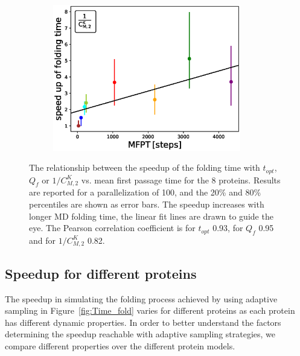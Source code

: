 \begin{figure}[!ht]
\begin{subfigure}[t]{0.5\textwidth}
    \includegraphics[width=0.9\textwidth]{figures/compare_MD_speed_up_cmacro_kin_cont_50_6_steps10000_52.eps}
  \end{subfigure}
  \caption{The relationship between the speedup of the folding time with $t_{opt}$, $Q_f$
  or $1/C_{M,2}^K$ vs. mean first passage time for the 8 proteins. Results are reported for a
  parallelization of 100, and the 20\% and 80\% percentiles are shown as error
  bars. The speedup increases with longer MD folding time, the linear fit lines are drawn to guide the eye. The Pearson
  correlation coefficient is for $t_{opt}$ 0.93, for $Q_f$ 0.95 and for
  $1/C_{M,2}^K$ 0.82.}
  \label{fig:compare-MD-speed-cmacro}
\end{figure}


\subsection{\label{sec:compare}Speedup for different proteins}

The speedup in simulating the folding process achieved by using adaptive
sampling in Figure~\ref{fig:Time_fold} varies for different proteins as each
protein has different dynamic properties. In order to better understand the
factors determining the speedup reachable with adaptive sampling strategies, we
compare different properties over the different protein models.

